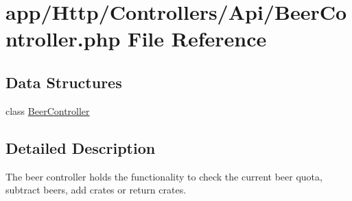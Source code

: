 \hypertarget{_beer_controller_8php}{}\section{app/\+Http/\+Controllers/\+Api/\+Beer\+Controller.php File Reference}
\label{_beer_controller_8php}
\subsection*{Data Structures}
\begin{DoxyCompactItemize}
\item 
class \mbox{\hyperlink{class_app_1_1_http_1_1_controllers_1_1_a_p_i_1_1_beer_controller}{Beer\+Controller}}
\end{DoxyCompactItemize}


\subsection{Detailed Description}
The beer controller holds the functionality to check the current beer quota, subtract beers, add crates or return crates. 